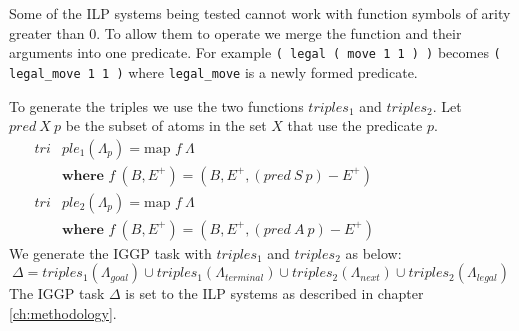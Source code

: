 Some of the ILP systems being tested cannot work with function symbols of arity greater than 0. To allow them to operate we merge the function and their arguments into one predicate. For example \texttt{( legal ( move 1 1 ) )} becomes \verb|( legal_move 1 1 )| where \verb|legal_move| is a newly formed predicate.

To generate the triples we use the two functions $triples_1$ and $triples_2$. Let $pred\ X\ p$ be the subset of atoms in the set $X$ that use the predicate $p$.
\begin{align*}
tri&ple_1(\Lambda_p) = \text{map } f\ \Lambda\\
&\textbf{where } f\ (B,E^+) = (B,E^+,(pred\ S\ p) - E^+) \ \ \ \ \ \ \ \ \ \ \ \ \ \ \ \ \ \ \ \ \ \ \ \ \ \ \ \ \ \ \ \ \ \ \ \ \ \\
tri&ple_2(\Lambda_p) = \text{map } f\ \Lambda \\
&\textbf{where } f\ (B,E^+) = (B,E^+,(pred\ A\ p) - E^+)
\end{align*}
We generate the IGGP task with $triples_1$ and $triples_2$ as below:
\[\Delta = triples_1(\Lambda_{goal}) \cup triples_1(\Lambda_{terminal}) \cup triples_2(\Lambda_{next}) \cup triples_2(\Lambda_{legal})\]
The IGGP task $\Delta$ is set to the ILP systems as described in chapter \ref{ch:methodology}.
